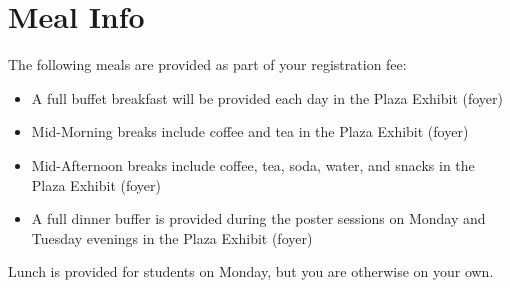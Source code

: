 \setheaders{}{}
\section{Meal Info}{}

The following meals are provided as part of your registration fee:

\begin{itemize}
\item A full buffet breakfast will be provided each day in the Plaza
  Exhibit (foyer)
\item Mid-Morning breaks include coffee and tea in the Plaza Exhibit
  (foyer)
\item Mid-Afternoon breaks include coffee, tea, soda, water, and
  snacks in the Plaza Exhibit (foyer)
\item A full dinner buffer is provided during the poster sessions on
  Monday and Tuesday evenings in the Plaza Exhibit (foyer)
\end{itemize}

Lunch is provided for students on Monday, but you are otherwise on
your own.


